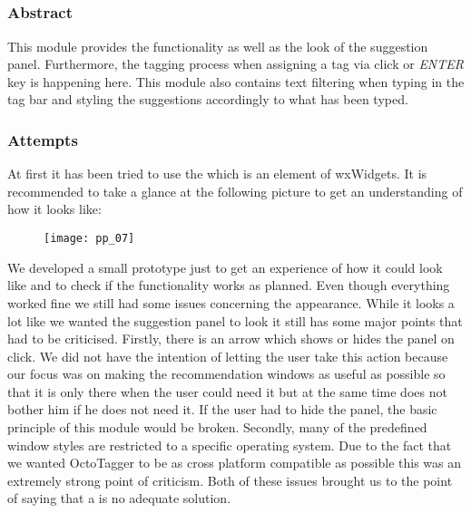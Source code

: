 \subsection{}
\label{sub:mod:autocomplete}
\def\kapitelautor{Christoph Führer}

\subsubsection{Abstract}

This module provides the functionality as well as the look of the suggestion panel. Furthermore, the tagging process when assigning a tag via click or \textit{ENTER} key is happening here. This module also contains text filtering when typing in the tag bar and styling the suggestions accordingly to what has been typed.

\subsubsection{Attempts}

At first it has been tried to use the  \cite{wxcombobox} which is an element of wxWidgets. It is recommended to take a glance at the following picture to get an understanding of how it looks like:

\begin{figure}[H]
    \centering
    \texttt{[image: pp\_07]}
    \caption{}
\end{figure}

We developed a small prototype just to get an experience of how it could look like and to check if the functionality works as planned. Even though everything worked fine we still had some issues concerning the appearance.
While it looks a lot like we wanted the suggestion panel to look it still has some major points that had to be criticised. Firstly, there is an arrow which shows or hides the panel on click. We did not have the intention of letting the user take this action because our focus was on making the recommendation windows as useful as possible so that it is only there when the user could need it but at the same time does not bother him if he does not need it. If the user had to hide the panel, the basic principle of this module would be broken. Secondly, many of the predefined window styles are restricted to a specific operating system. Due to the fact that we wanted OctoTagger to be as cross platform compatible as possible this was an extremely strong point of criticism. Both of these issues brought us to the point of saying that a  is no adequate solution.

